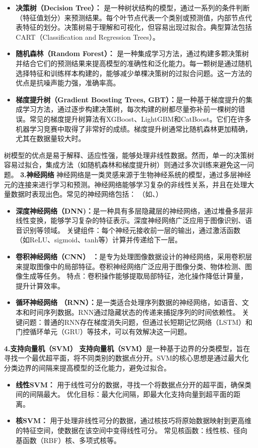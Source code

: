 \begin{itemize}
\item  {\bf 决策树（Decision Tree）：} 是一种树状结构的模型，通过一系列的条件判断（特征值划分）来预测结果。每个叶节点代表一个类别或预测值，内部节点代表特征的划分。决策树易于理解和可视化，但容易出现过拟合。典型算法包括CART（Classification and Regression Trees）。
\item  {\bf  随机森林（Random Forest）： }是一种集成学习方法，通过构建多颗决策树并结合它们的预测结果来提高模型的准确性和泛化能力。每一颗树是通过随机选择特征和训练样本构建的，能够减少单棵决策树的过拟合问题。这一方法的优点是抗噪声能力强，准确率高。
\item  {\bf  梯度提升树（Gradient Boosting Trees, GBT）：}是一种基于梯度提升的集成学习方法，通过逐步构建决策树，每次构建的树都尽量弥补前一棵树的错误。常见的梯度提升树算法有XGBoost、LightGBM和CatBoost。它们在许多机器学习竞赛中取得了非常好的成绩。梯度提升树通常比随机森林更加精确，尤其在数据量较大时。
\end{itemize}
树模型的优点是易于解释、适应性强，能够处理非线性数据。然而，单一的决策树容易过拟合，集成方法（如随机森林和梯度提升树）则通过多次训练来避免这一问题。
{\bf 3.神经网络}
神经网络是一类灵感来源于生物神经系统的模型，通过多层神经元的连接来进行学习和预测。神经网络能够学习复杂的非线性关系，并且在处理大量数据时表现出色。常见的神经网络包括： （如、）
\begin{itemize}
\item {\bf 深度神经网络（DNN)：}是一种具有多层隐藏层的神经网络，通过堆叠多层非线性变换，能够学习复杂的特征表示。深度神经网络广泛应用于图像识别、语音识别等领域。
关键组件：每个神经元接收前一层的输出，通过激活函数（如ReLU、sigmoid、tanh等）计算并传递给下一层。
\item  {\bf 卷积神经网络（CNN） ：}是专为处理图像数据设计的神经网络，采用卷积层来提取图像中的局部特征。卷积神经网络广泛应用于图像分类、物体检测、图像生成等任务。
特点：卷积操作能够提取局部特征，池化操作降低计算量，提升计算效率。
\item  {\bf 循环神经网络  （RNN）：}是一类适合处理序列数据的神经网络，如语音、文本和时间序列数据。RNN通过隐藏状态的传递来捕捉序列的时间依赖性。
关键问题：普通的RNN存在梯度消失问题，但通过长短期记忆网络（LSTM）和门控循环单元（GRU）等技术，可以有效解决这一问题。
\end{itemize}
{\bf 4.支持向量机（SVM）    }
{\bf 支持向量机（SVM）}是一种基于边界的分类模型，旨在寻找一个最优超平面，将不同类别的数据点分开。SVM的核心思想是通过最大化分类边界的间隔来提高模型的泛化能力，避免过拟合。
\begin{itemize}
\item {\bf  线性SVM：  } 用于线性可分的数据，寻找一个将数据点分开的超平面，确保类间的间隔最大。
优化目标：最大化间隔，即最大化支持向量到超平面的距离。
\item  {\bf  核SVM：  } 用于处理非线性可分的数据，通过核技巧将原始数据映射到更高维的特征空间，使数据在该空间中变得线性可分。
常见核函数：线性核、径向基函数（RBF）核、多项式核等。
\end{itemize}
